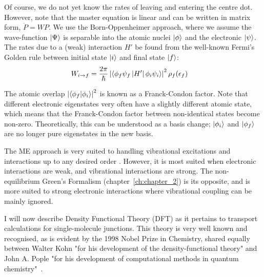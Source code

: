 Of course, we do not yet know the rates of leaving and entering the centre dot. However, note that the master equation is linear and can be written in matrix form, $\dot{P} = W P$. We use the Born-Oppenheimer approach, where we assume the wave-function $\ket{\Psi}$ is separable into the atomic nuclei $\ket{\phi}$ and the electronic $\ket{\psi}$. The rates due to a (weak) interaction $H'$ be found from the well-known Fermi's Golden rule between initial state $\ket{i}$ and final state $\ket{f}$:
\begin{align*}
W_{i\rightarrow f} &= \frac{2\pi}{\hslash} \left| \braket{\phi_f \psi_f \left|H'\right| \phi_i \psi_i}\right|^2 \rho_f (\epsilon_f)
\end{align*}

The atomic overlap $\left| \braket{ \phi_f | \phi_i }\right|^2$ is known as a Franck-Condon factor. Note that different electronic eigenstates very often have a slightly different atomic state, which means that the Franck-Condon factor between non-identical states become non-zero. Theoretically, this can be understood as a basis change; $\ket{\phi_i}$ and $\ket{\phi_f}$ are no longer pure eigenstates in the new basis. 

The ME approach is very suited to handling vibrational excitations and interactions up to any desired order \cite{seldenthuis}. However, it is most suited when electronic interactions are weak, and vibrational interactions are strong. The non-equilibrium Green's Formalism (chapter~\ref{ch:chapter_2}) is its opposite, and is more suited to strong electronic interactions where vibrational coupling can be mainly ignored. 

I will now describe Density Functional Theory (DFT) as it pertains to transport calculations for single-molecule junctions. This theory is very well known and recognised, as is evident by the 1998 Nobel Prize in Chemistry, shared equally between Walter Kohn "for his development of the density-functional theory" and John A. Pople "for his development of computational methods in quantum chemistry"~\cite{nobel1998}. 

